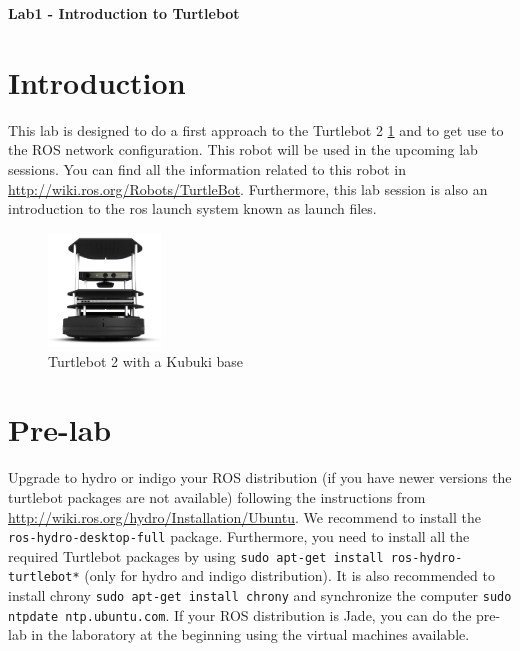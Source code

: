\documentclass[a4paper,10pt]{article}
\begin{document}
\marginsize{2cm}{2cm}{2cm}{2cm}

\begin{center}
\Large \textbf{Lab1 - Introduction to Turtlebot}
\end{center}

\section{Introduction}

This lab is designed to do a first approach to the Turtlebot 2 \ref{fig:turtlebot2} and to get use to the ROS network configuration. This robot will be used in the upcoming lab sessions. You can find all the information related to this robot in \url{http://wiki.ros.org/Robots/TurtleBot}. Furthermore, this lab session is also an introduction to the ros launch system known as launch files.

\begin{figure}[h!]
	\centering
	\includegraphics[width=3cm]{turtlebot2}
	\caption{Turtlebot 2 with a Kubuki base}
	\label{fig:turtlebot2}
\end{figure}


\section{Pre-lab}

Upgrade to hydro or indigo your ROS distribution (if you have newer versions the turtlebot packages are not available) following the instructions from \url{http://wiki.ros.org/hydro/Installation/Ubuntu}. We recommend to install the \texttt{ros-hydro-desktop-full} package. Furthermore, you need to install all the required Turtlebot packages by using \texttt{sudo apt-get install ros-hydro-turtlebot*} (only for hydro and indigo distribution). It is also recommended to install chrony \texttt{sudo apt-get install chrony} and synchronize the computer \texttt{sudo ntpdate ntp.ubuntu.com}. If your ROS distribution is Jade, you can do the pre-lab in the laboratory at the beginning using the virtual machines available.
\end{document}
